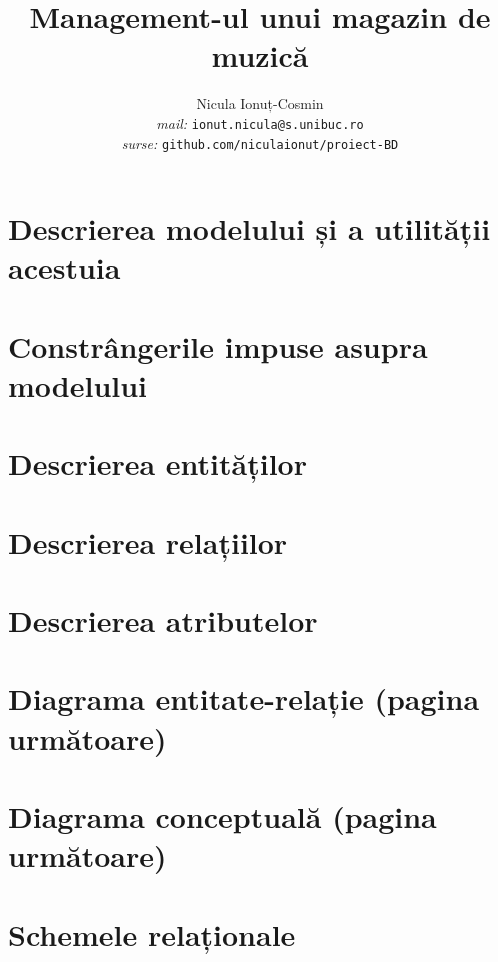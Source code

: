 \documentclass[a4paper,oneside, 12pt]{article}
\title{Management-ul unui magazin de muzică}
\author{Nicula Ionuț-Cosmin \\ \emph{mail: }\texttt{ionut.nicula@s.unibuc.ro} \\ \emph{surse: }\texttt{github.com/niculaionut/proiect-BD}}
\begin{document}
\maketitle

\section{Descrierea modelului și a utilității acestuia}

\section{Constrângerile impuse asupra modelului}

\section{Descrierea entităților}

\section{Descrierea relațiilor}

\section{Descrierea atributelor}

\section{Diagrama entitate-relație (pagina următoare)}



\section{Diagrama conceptuală (pagina următoare)}



\section{Schemele relaționale}

\begin{center}



\end{center}
\end{document}
